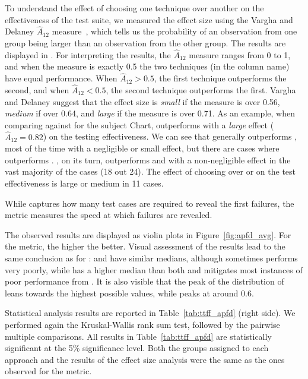 To understand the effect of choosing one technique over another on the effectiveness of the test suite, we measured the effect size using the Vargha and Delaney $\hat{A}_{12}$ measure~\citep{vargha2000critique}, which tells us the probability of an observation from one group being larger than an observation from the other group.
The results are displayed in . For interpreting the results, the $\hat{A}_{12}$ measure ranges from 0 to 1, and when the measure is exactly 0.5 the two techniques (in the column name) have equal performance. When $\hat{A}_{12}>0.5$, the first technique outperforms the second, and when $\hat{A}_{12}<0.5$, the second technique outperforms the first.
Vargha and Delaney suggest that the effect size is \textit{small} if the measure is over 0.56, \textit{medium} if over 0.64, and \textit{large} if the measure is over 0.71. As an example, when comparing \fz against \rnd for the subject Chart, \fz outperforms \rnd with a \textit{large} effect ($\hat{A}_{12}=0.82$) on the testing effectiveness.  
%
We can see that \ek generally outperforms \fs, most of the time with a negligible or small effect, but there are cases where \fs outperforms \ek.
\fz, on its turn, outperforms \ek and \fs with a non-negligible effect in the vast majority of the cases (18 out 24). The effect of choosing \fz over \ek or \fs on the test effectiveness is large or medium in 11 cases.


While \ttff captures how many test cases are required to reveal the first failures, 
the \apfd metric measures the speed at which failures are revealed.

The observed \apfd results are displayed as violin plots in Figure~\ref{fig:apfd_avg}.
For the \apfd metric, the higher
the better.
Visual assessment of the results lead to the same conclusion as for \pttff:
\ek and \fs have similar medians, although \fs sometimes performs very poorly, while \fz has a higher median than both and mitigates most instances of poor performance from \fs.
It is also visible that the peak of the distribution of \fz leans towards the highest possible values, while \ek peaks at around 0.6.

Statistical analysis results are reported in Table~\ref{tab:ttff_apfd} (right side). 
We performed again the Kruskal-Wallis rank sum test, followed by the pairwise multiple
comparisons.
All  results in Table~\ref{tab:ttff_apfd} are statistically
significant at the 5\% significance level.
Both the groups assigned to each approach 
and the results of the effect size analysis were the same as the ones observed for the \ttff metric.


